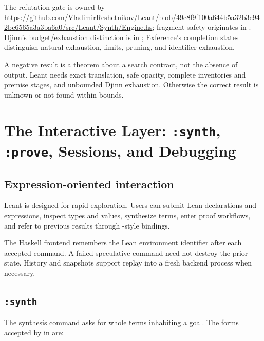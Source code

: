 \documentclass[10pt,letterpaper,oneside,openany]{report}
\newcommand{\term}[1]{\texttt{\detokenize{#1}}}
\begin{document}
\begin{sourcebox}
The refutation gate is owned by \url{https://github.com/VladimirReshetnikov/Leant/blob/49c8f9f100a644b5a32b3c942bc6565a3a3ba6a0/src/Leant/Synth/Engine.hs}; fragment safety originates in .  Djinn's budget/exhaustion distinction is in ; Exference's completion states distinguish natural exhaustion, limits, pruning, and identifier exhaustion.
\end{sourcebox}

\begin{recapbox}
A negative result is a theorem about a search contract, not the absence of output.  Leant needs exact translation, safe opacity, complete inventories and premise stages, and unbounded Djinn exhaustion.  Otherwise the correct result is unknown or not found within bounds.
\end{recapbox}

\chapter{The Interactive Layer: \texttt{:synth}, \texttt{:prove}, Sessions, and Debugging}\label{ch:repl}

\section{Expression-oriented interaction}

Leant is designed for rapid exploration.  Users can submit Lean declarations and expressions, inspect types and values, synthesize terms, enter proof workflows, and refer to previous results through \term{it}-style bindings.

The Haskell frontend remembers the Lean environment identifier after each accepted command.  A failed speculative command need not destroy the prior state.  History and snapshots support replay into a fresh backend process when necessary.

\section{\texttt{:synth}}

The synthesis command asks for whole terms inhabiting a goal.  The forms accepted by \term{cmdSynth} in  are:
\end{document}
